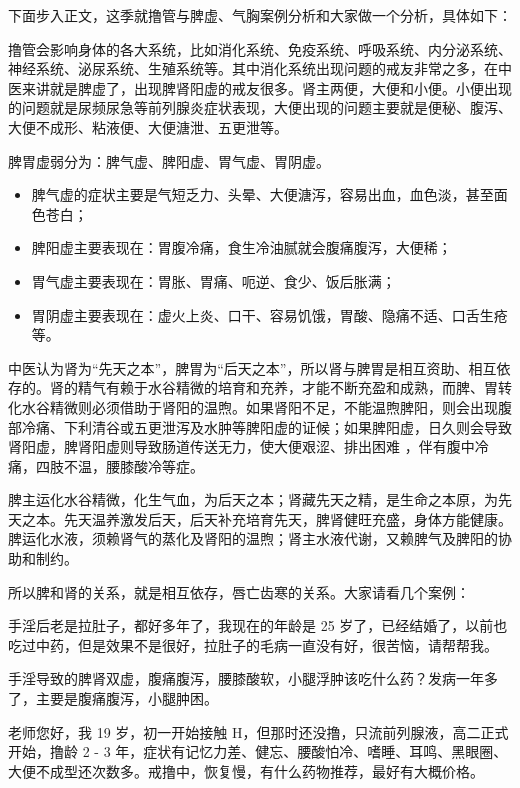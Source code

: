 下面步入正文，这季就撸管与脾虚、气胸案例分析和大家做一个分析，具体如下：

撸管会影响身体的各大系统，比如消化系统、免疫系统、呼吸系统、内分泌系统、神经系统、泌尿系统、生殖系统等。其中消化系统出现问题的戒友非常之多，在中医来讲就是脾虚了，出现脾肾阳虚的戒友很多。肾主两便，大便和小便。小便出现的问题就是尿频尿急等前列腺炎症状表现，大便出现的问题主要就是便秘、腹泻、大便不成形、粘液便、大便溏泄、五更泄等。

脾胃虚弱分为：脾气虚、脾阳虚、胃气虚、胃阴虚。

\begin{itemize}
    \item 脾气虚的症状主要是气短乏力、头晕、大便溏泻，容易出血，血色淡，甚至面色苍白；
    \item 脾阳虚主要表现在：胃腹冷痛，食生冷油腻就会腹痛腹泻，大便稀；
    \item 胃气虚主要表现在：胃胀、胃痛、呃逆、食少、饭后胀满；
    \item 胃阴虚主要表现在：虚火上炎、口干、容易饥饿，胃酸、隐痛不适、口舌生疮等。
\end{itemize}

中医认为肾为“先天之本”，脾胃为“后天之本”，所以肾与脾胃是相互资助、相互依存的。肾的精气有赖于水谷精微的培育和充养，才能不断充盈和成熟，而脾、胃转化水谷精微则必须借助于肾阳的温煦。如果肾阳不足，不能温煦脾阳，则会出现腹部冷痛、下利清谷或五更泄泻及水肿等脾阳虚的证候；如果脾阳虚，日久则会导致肾阳虚，脾肾阳虚则导致肠道传送无力，使大便艰涩、排出困难 ，伴有腹中冷痛，四肢不温，腰膝酸冷等症。

脾主运化水谷精微，化生气血，为后天之本；肾藏先天之精，是生命之本原，为先天之本。先天温养激发后天，后天补充培育先天，脾肾健旺充盛，身体方能健康。脾运化水液，须赖肾气的蒸化及肾阳的温煦；肾主水液代谢，又赖脾气及脾阳的协助和制约。

所以脾和肾的关系，就是相互依存，唇亡齿寒的关系。大家请看几个案例：

\begin{case}
    手淫后老是拉肚子，都好多年了，我现在的年龄是 25 岁了，已经结婚了，以前也吃过中药，但是效果不是很好，拉肚子的毛病一直没有好，很苦恼，请帮帮我。
\end{case}

\begin{case}
    手淫导致的脾肾双虚，腹痛腹泻，腰膝酸软，小腿浮肿该吃什么药？发病一年多了，主要是腹痛腹泻，小腿肿困。
\end{case}

\begin{case}
    老师您好，我 19 岁，初一开始接触 H，但那时还没撸，只流前列腺液，高二正式开始，撸龄 2 - 3 年，症状有记忆力差、健忘、腰酸怕冷、嗜睡、耳鸣、黑眼圈、大便不成型还次数多。戒撸中，恢复慢，有什么药物推荐，最好有大概价格。
\end{case}

